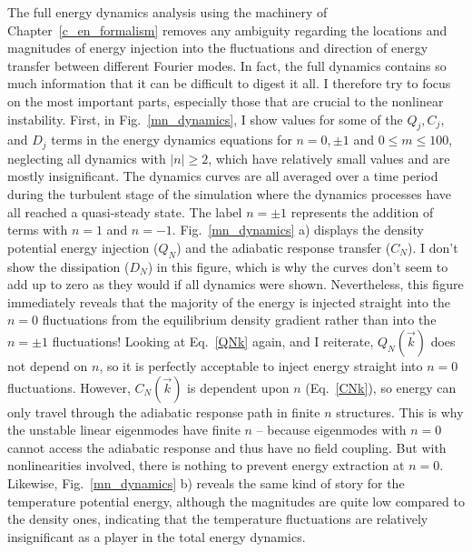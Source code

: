 The full energy dynamics analysis using the machinery of Chapter~\ref{c_en_formalism} removes any ambiguity regarding the locations and magnitudes of energy injection into the fluctuations
and direction of energy transfer between different Fourier modes. In fact, the full dynamics contains so much information that it can be difficult to digest it all. I therefore try to
focus on the most important parts, especially those that are crucial to the nonlinear instability. First, in Fig.~\ref{mn_dynamics}, I show values for some of the $Q_j, C_j,$ and $D_j$
terms in the energy dynamics equations for $n=0, \pm 1$ and $0 \le m \le 100$,
neglecting all dynamics with $|n| \ge 2$, which have relatively small values and are mostly insignificant. The dynamics curves are all averaged over a time period during the
turbulent stage of the simulation where the dynamics processes have all reached a quasi-steady state.
The label $n = \pm 1$ represents the addition of terms with $n=1$ and $n=-1$.
Fig.~\ref{mn_dynamics} a) displays the density potential energy injection ($Q_N$) and the adiabatic response transfer ($C_N$). I don't show the dissipation ($D_N$) in this figure, which
is why the curves don't seem to add up to zero as they would if all dynamics were shown.
Nevertheless, this figure immediately reveals that the majority of the energy is injected
straight into the $n=0$ fluctuations from the equilibrium density gradient rather than into the $n= \pm 1$ fluctuations! Looking at Eq.~\ref{QNk} again, and I reiterate, $Q_N(\vec{k})$ does not
depend on $n$, so it is perfectly acceptable to inject energy straight into $n=0$ fluctuations. However, $C_N(\vec{k})$ is dependent upon $n$ (Eq.~\ref{CNk}), so energy can only travel
through the adiabatic response path in finite $n$ structures. This is why the unstable linear eigenmodes have finite $n$ -- because eigenmodes with $n=0$ cannot access the adiabatic response and thus
have no field coupling. But with nonlinearities involved, there is nothing to prevent energy extraction at $n=0$.
Likewise, Fig.~\ref{mn_dynamics} b) reveals the same kind of story for the temperature potential energy, although the magnitudes are quite low compared to the density ones,
indicating that the temperature fluctuations are relatively insignificant as a player in the total energy dynamics.

